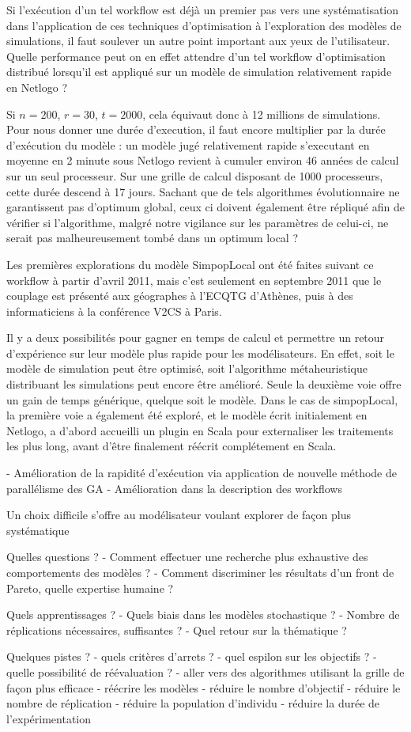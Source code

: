 Si l'exécution d'un tel workflow est déjà un premier pas vers une systématisation dans l'application de ces techniques d'optimisation à l'exploration des modèles de simulations, il faut soulever un autre point important aux yeux de l'utilisateur. Quelle performance peut on en effet attendre d'un tel workflow d'optimisation distribué lorsqu'il est appliqué sur un modèle de simulation relativement rapide en Netlogo ?

Si $n=200$, $r = 30$, $t=2000$, cela équivaut donc à 12 millions de simulations. Pour nous donner une durée d'execution, il faut encore multiplier par la durée d'exécution du modèle : un modèle jugé relativement rapide s'executant en moyenne en 2 minute sous Netlogo revient à cumuler environ 46 années de calcul sur un seul processeur. Sur une grille de calcul disposant de 1000 processeurs, cette durée descend à 17 jours. Sachant que de tels algorithmes évolutionnaire ne garantissent pas d'optimum global, ceux ci doivent également être répliqué afin de vérifier si l'algorithme, malgré notre vigilance sur les paramètres de celui-ci, ne serait pas malheureusement tombé dans un optimum local ?

Les premières explorations du modèle SimpopLocal ont été faites suivant ce workflow à partir d'avril 2011, mais c'est seulement en septembre 2011 que le couplage est présenté aux géographes à l'ECQTG d'Athènes, puis à des informaticiens à la conférence V2CS à Paris.

Il y a deux possibilités pour gagner en temps de calcul et permettre un retour d'expérience sur leur modèle plus rapide pour les modélisateurs. En effet, soit le modèle de simulation peut être optimisé, soit l'algorithme métaheuristique distribuant les simulations peut encore être amélioré. Seule la deuxième voie offre un gain de temps générique, quelque soit le modèle. Dans le cas de simpopLocal, la première voie a également été exploré, et le modèle écrit initialement en Netlogo, a d'abord accueilli un plugin en Scala pour externaliser les traitements les plus long, avant d'être finalement réécrit complétement en Scala.


- Amélioration de la rapidité d'exécution via application de nouvelle méthode de parallélisme des GA
- Amélioration dans la description des workflows


Un choix difficile s'offre au modélisateur voulant explorer de façon plus systématique

Quelles questions ?
- Comment effectuer une recherche plus exhaustive des comportements des modèles ?
- Comment discriminer les résultats d'un front de Pareto, quelle expertise humaine ?

Quels apprentissages ?
- Quels biais dans les modèles stochastique ?
- Nombre de réplications nécessaires, suffisantes ?
- Quel retour sur la thématique ?

Quelques pistes ?
- quels critères d'arrets ?
- quel espilon sur les objectifs ?
- quelle possibilité de réévaluation ?
- aller vers des algorithmes utilisant la grille de façon plus efficace
- réécrire les modèles
- réduire le nombre d'objectif
- réduire le nombre de réplication
- réduire la population d'individu
- réduire la durée de l'expérimentation
